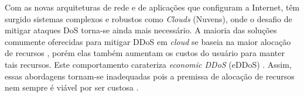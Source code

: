 Com as novas arquiteturas de rede e de aplicações que configuram a Internet, têm surgido sistemas complexos e robustos como \emph{Clouds} (Nuvens), onde o desafio de mitigar ataques DoS torna-se ainda mais necessário. A maioria das soluções comumente oferecidas para mitigar DDoS em \emph{cloud} se baseia na maior alocação de recursos \cite{Peng:2007:SND:1216370.1216373}, porém elas também aumentam os custos do usuário para manter tais recursos. Este comportamento carateriza \emph{economic DDoS} (eDDoS) \cite{Soon:10}.  
%
Assim, essas abordagens tornam-se inadequadas pois a premissa de alocação de recursos nem sempre é viável por ser custosa \cite{Bakshi:10}. %

